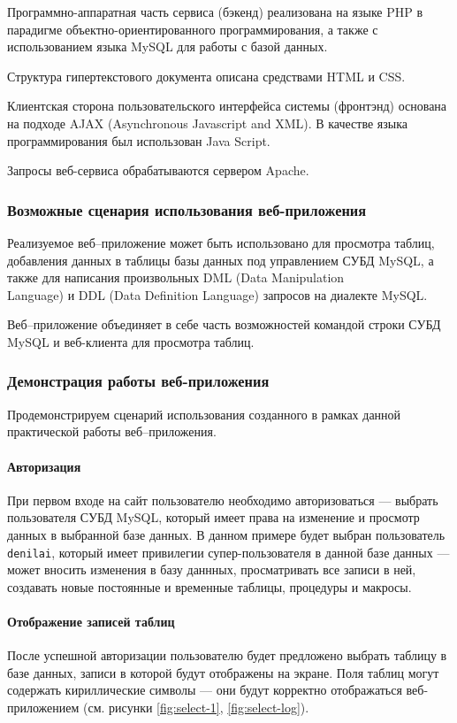 \documentclass[a4paper,14pt]{extarticle}
\begin{document}
Программно-аппаратная часть сервиса (бэкенд) реализована на языке PHP в парадигме объектно-ориентированного программирования, а также с использованием языка MySQL для работы с базой данных.

Структура гипертекстового документа описана средствами HTML и CSS.

Клиентская сторона пользовательского интерфейса системы (фронтэнд) основана на подходе AJAX (Asynchronous Javascript and XML). В качестве языка программирования был использован Java Script. 

Запросы веб-сервиса обрабатываются сервером Apache.


\subsubsection*{Возможные сценария использования веб-приложения}

Реализуемое веб--приложение может быть использовано для просмотра таблиц, добавления данных в таблицы базы данных под управлением СУБД MySQL, а также для написания произвольных DML (Data Manipulation\\ Language) и DDL (Data Definition Language) запросов на диалекте MySQL. 

Веб--приложение объединяет в себе часть возможностей командой строки СУБД MySQL и веб-клиента для просмотра таблиц.


\subsubsection*{Демонстрация работы веб-приложения}

Продемонстрируем сценарий использования созданного в рамках данной практической работы веб--приложения. 

\paragraph{Авторизация}
При первом входе на сайт пользователю необходимо авторизоваться --- выбрать пользователя СУБД MySQL, который имеет права на изменение и просмотр данных в выбранной базе данных. В данном примере будет выбран пользователь \texttt{denilai}, который имеет привилегии супер-пользователя в данной базе данных --- может вносить изменения в базу даннных, просматривать все записи в ней, создавать новые постоянные и временные таблицы, процедуры и макросы.

\paragraph{Отображение записей таблиц}
После успешной авторизации пользователю будет предложено выбрать таблицу в базе данных, записи в которой будут отображены на экране. Поля таблиц могут содержать кириллические символы --- они будут корректно отображаться веб-приложением (см. рисунки \ref{fig:select-1}, \ref{fig:select-log}).
\end{document}
